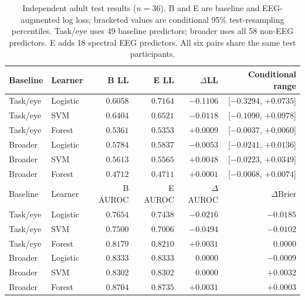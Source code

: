\begin{table}[htbp]\centering
\caption{Independent adult test results ($n=36$). B and E are baseline and EEG-augmented log loss; bracketed values are conditional 95\% test-resampling percentiles. Task/eye uses 49 baseline predictors; broader uses all 58 non-EEG predictors. E adds 18 spectral EEG predictors. All six pairs share the same test participants.}\label{tab:adult-extension}
\begin{tabular}{llrrrr}\toprule
Baseline & Learner & B LL & E LL & $\Delta$LL & Conditional range\\\midrule
Task/eye & Logistic & $0.6058$ & $0.7164$ & $-0.1106$ & [$-0.3294$, $+0.0735$]\\
Task/eye & SVM & $0.6404$ & $0.6521$ & $-0.0118$ & [$-0.1090$, $+0.0978$]\\
Task/eye & Forest & $0.5361$ & $0.5353$ & $+0.0009$ & [$-0.0037$, $+0.0060$]\\
Broader & Logistic & $0.5784$ & $0.5837$ & $-0.0053$ & [$-0.0241$, $+0.0136$]\\
Broader & SVM & $0.5613$ & $0.5565$ & $+0.0048$ & [$-0.0223$, $+0.0349$]\\
Broader & Forest & $0.4712$ & $0.4711$ & $+0.0001$ & [$-0.0068$, $+0.0074$]\\
\midrule Baseline & Learner & B AUROC & E AUROC & $\Delta$AUROC & $\Delta$Brier\\\midrule
Task/eye & Logistic & $0.7654$ & $0.7438$ & $-0.0216$ & $-0.0185$\\
Task/eye & SVM & $0.7500$ & $0.7006$ & $-0.0494$ & $-0.0102$\\
Task/eye & Forest & $0.8179$ & $0.8210$ & $+0.0031$ & $0.0000$\\
Broader & Logistic & $0.8333$ & $0.8333$ & $0.0000$ & $-0.0009$\\
Broader & SVM & $0.8302$ & $0.8302$ & $0.0000$ & $+0.0032$\\
Broader & Forest & $0.8704$ & $0.8735$ & $+0.0031$ & $+0.0003$\\
\bottomrule\end{tabular}\end{table}
